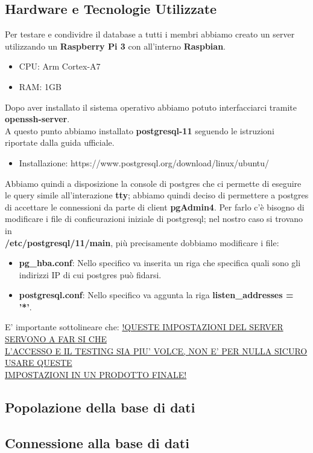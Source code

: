 \documentclass[legalpaper]{article}
\begin{document}
\subsection{Hardware e Tecnologie Utilizzate}
Per testare e condividre il database a tutti i membri abbiamo creato un server utilizzando un \textbf{Raspberry Pi 3} con all'interno \textbf{Raspbian}.
\begin{itemize}
	\item CPU: Arm Cortex-A7
	\item RAM: 1GB
\end{itemize}
Dopo aver installato il sistema operativo abbiamo potuto interfacciarci tramite \textbf{openssh-server}.\\
A questo punto abbiamo installato \textbf{postgresql-11} seguendo le istruzioni riportate dalla guida ufficiale.
\begin{itemize}
	\item Installazione: https://www.postgresql.org/download/linux/ubuntu/
\end{itemize}
Abbiamo quindi a disposizione la console di postgres che ci permette di eseguire le query simile all'interazione \textbf{tty}; abbiamo quindi deciso di permettere a postgres di accettare le connessioni
da parte di client \textbf{pgAdmin4}.\newline
Per farlo c'è bisogno di modificare i file di conficurazioni iniziale di postgresql; nel nostro caso si trovano in \\ \textbf{/etc/postgresql/11/main},
più precisamente dobbiamo modificare i file:
\begin{itemize}
	\item \textbf{pg\_hba.conf}: Nello specifico va inserita un riga che specifica quali sono gli indirizzi IP di cui postgres può fidarsi.
	\item \textbf{postgresql.conf}: Nello specifico va aggunta la riga \textbf{listen\_addresses = '*'}.
\end{itemize}
E' importante sottolineare che: \underline{!QUESTE IMPOSTAZIONI DEL SERVER SERVONO A FAR SI CHE}\\ 
\underline{L'ACCESSO E IL TESTING SIA PIU' VOLCE, NON E' PER NULLA SICURO USARE QUESTE}\\
\underline{IMPOSTAZIONI IN UN PRODOTTO FINALE!}
\subsection{Popolazione della base di dati}
\subsection{Connessione alla base di dati}
\end{document}
